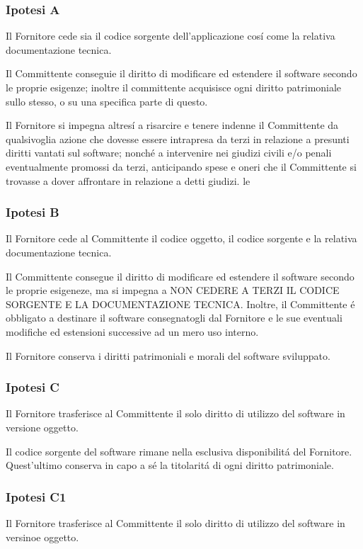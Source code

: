 \documentclass{article}
\begin{document}
\subsubsection*{Ipotesi A}
Il Fornitore cede sia il codice sorgente dell'applicazione cos\'i come la relativa documentazione tecnica.

Il Committente conseguie il diritto di modificare ed estendere il software secondo le proprie esigenze; inoltre il committente acquisisce ogni diritto patrimoniale sullo stesso, o su una specifica parte di questo.

Il Fornitore si impegna altres\'i a risarcire e tenere indenne il Committente da qualsivoglia azione che dovesse essere intrapresa da terzi in relazione a presunti diritti vantati sul software; nonch\'e a intervenire nei giudizi civili e/o penali eventualmente promossi da terzi, anticipando spese e oneri che il Committente si trovasse a dover affrontare in relazione a detti giudizi.
le
\subsubsection*{Ipotesi B}
Il Fornitore cede al Committente il codice oggetto, il codice sorgente e la relativa documentazione tecnica. 

Il Committente consegue il diritto di modificare ed estendere il software secondo le proprie esigeneze, ma si impegna a NON CEDERE A TERZI IL CODICE SORGENTE E LA DOCUMENTAZIONE TECNICA. Inoltre, il Committente \'e obbligato a destinare il software consegnatogli dal Fornitore e le sue eventuali modifiche ed estensioni successive ad un mero uso interno.

Il Fornitore conserva i diritti patrimoniali e morali del software sviluppato.

\subsubsection{Ipotesi C}
Il Fornitore trasferisce al Committente il solo diritto di utilizzo del software in versione oggetto. 

Il codice sorgente del software rimane nella esclusiva disponibilit\'a del Fornitore. Quest'ultimo conserva in capo a s\'e la titolarit\'a di ogni diritto patrimoniale.

\subsubsection{Ipotesi C1}
Il Fornitore trasferisce al Committente il solo diritto di utilizzo del software in versinoe oggetto.
\end{document}
